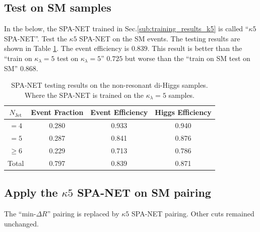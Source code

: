 \documentclass[12pt]{article}
\begin{document}
	\subsection{Test on SM samples}%
	\label{sub:test_on_sm_samples}
		In the below, the SPA-NET trained in Sec.\ref{sub:training_results_k5} is called ``$\kappa 5$ SPA-NET''. Test the $\kappa 5$ SPA-NET on the SM events. The testing results are shown in Table \ref{tab:SPANet_train_k5_test_SM}. The event efficiency is $0.839$. This result is better than the ``train on $\kappa_\lambda = 5$ test on $\kappa_\lambda=5$'' $0.725$ but worse than the ``train on SM test on SM'' $0.868$.
		\begin{table}[htpb]
			\centering
			\caption{SPA-NET testing results on the non-resonant di-Higgs samples. Where the SPA-NET is trained on the $\kappa_\lambda=5$ samples.}
			\label{tab:SPANet_train_k5_test_SM}
			\begin{tabular}{c|c|cc}
				$N_\text{Jet}$ & Event Fraction & Event Efficiency & Higgs Efficiency \\
				\hline
				$=4$	  &   0.280             &    0.933              &    0.940             \\
				$=5$	  &   0.287             &    0.841              &    0.876             \\
				$\ge 6$	  &   0.229             &    0.713              &    0.786             \\
				Total	  &   0.797             &    0.839              &    0.871             \\
			\end{tabular}
		\end{table}
	\subsection{Apply the \texorpdfstring{$\kappa 5$}{k5} SPA-NET on SM pairing}%
	\label{sub:apply_the_k5_spa_net_on_sm_pairing}
		The ``$ \text{min-}\Delta R$'' pairing is replaced by $\kappa 5$ SPA-NET pairing. Other cuts remained unchanged. 
\end{document}
